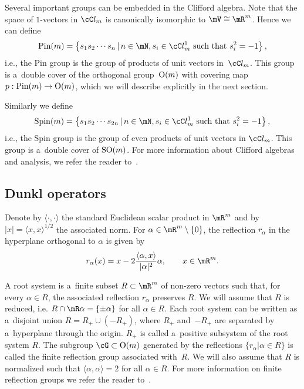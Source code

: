 Several important groups can be embedded in the Clif\/ford algebra.
Note that the space of $1$-vectors in $\cC l_{m}$ is canonically isomorphic to $\mV\cong\mR^{m}$.
Hence we can def\/ine
\begin{gather*}
\mathrm{Pin}(m)=\left\{s_{1}s_{2}\cdots s_{n}\,|\,n\in\mN,s_{i}\in\cC l_{m}^{1}\ \text{such that}\ s_{i}^{2}=-1\right\},
\end{gather*}
i.e., the Pin group is the group of products of unit vectors in~$\cC l_{m}$.
This group is a~double cover of the orthogonal group~${\rm O}(m)$ with covering map $p:\mathrm{Pin}(m)
\rightarrow {\rm O}(m)$, which we will describe explicitly in the next section.

Similarly we def\/ine
\begin{gather*}
\mathrm{Spin}(m)=\left\{s_{1}s_{2}\cdots s_{2n}\,|\,n\in\mN,s_{i}\in\cC l_{m}^{1} \ \text{such that} \ s_{i}^{2}=-1\right\},
\end{gather*}
i.e., the Spin group is the group of even products of unit vectors in $\cC l_{m}$.
This group is a~double cover of ${\rm SO}(m)$.
For more information about Clif\/ford algebras and analysis, we refer the reader to~\cite{MR1169463,MR1130821}.

\subsection{Dunkl operators}\label{section2.2}
Denote by $\langle\cdot,\cdot
\rangle$ the standard Euclidean scalar product in $\mR^{m}$ and by $|x|=\langle x,
x\rangle^{1/2}$ the associated norm.
For $\alpha\in\mR^{m}\setminus \{0\}$, the ref\/lection $r_{\alpha}$ in the hyperplane orthogonal to
$\alpha$ is given by
\begin{gather*}
r_{\alpha}(x)=x-2\frac{\langle\alpha,x\rangle}{|\alpha|^{2}}\alpha,\qquad x\in\mR^{m}.
\end{gather*}

A root system is a~f\/inite subset $R\subset\mR^{m}$ of non-zero vectors such that, for every
$\alpha\in R$, the associated ref\/lection $r_{\alpha}$ preserves $R$.
We will assume that $R$ is reduced, i.e.
$R\cap\mR\alpha=\{\pm\alpha\}$ for all $\alpha\in R$.
Each root system can be written as a~disjoint union $R=R_{+}\cup(-R_{+})$, where $R_{+}$ and~$-R_{+}$ are separated by a~hyperplane through the origin.
$R_+$ is called a~positive subsystem of the root system $R$.
The subgroup $\cG\subset {\rm O}(m)$ generated by the ref\/lections $\{r_{\alpha}|\alpha\in R\}$ is
called the f\/inite ref\/lection group associated with~$R$.
We will also assume that $R$ is normalized such that $\langle\alpha,\alpha\rangle=2$ for all
$\alpha\in R$.
For more information on f\/inite ref\/lection groups we refer the reader to~\cite{Humph}.

